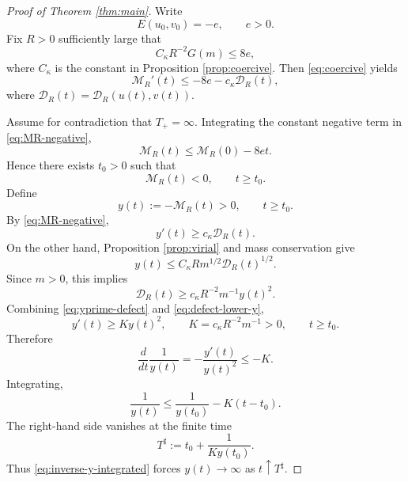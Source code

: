 \documentclass[10pt,a4paper]{amsart}
\numberwithin{equation}{section}
\begin{document}
\begin{proof}[Proof of Theorem \ref{thm:main}]
Write
\begin{equation*}
 E(u_0,v_0)=-e, \qquad e>0.
\end{equation*}
Fix $R>0$ sufficiently large that
\begin{equation*}
 C_\kappa R^{-2}G(m)\le8e,
\end{equation*}
where $C_\kappa$ is the constant in Proposition \ref{prop:coercive}.  Then \eqref{eq:coercive} yields
\begin{equation}\label{eq:MR-negative}
 \mathcal M_R'(t)\le-8e-c_\kappa\mathcal D_R(t),
\end{equation}
where $\mathcal D_R(t)=\mathcal D_R(u(t),v(t))$.

Assume for contradiction that $T_+=\infty$.  Integrating the constant negative term in \eqref{eq:MR-negative},
\begin{equation*}
 \mathcal M_R(t)\le\mathcal M_R(0)-8et.
\end{equation*}
Hence there exists $t_0>0$ such that
\[
 \mathcal M_R(t)<0, \qquad t\ge t_0.
\]
Define
\begin{equation*}
 y(t):=-\mathcal M_R(t)>0,
 \qquad t\ge t_0.
\end{equation*}
By \eqref{eq:MR-negative},
\begin{equation}\label{eq:yprime-defect}
 y'(t)\ge c_\kappa\mathcal D_R(t).
\end{equation}
On the other hand, Proposition \ref{prop:virial} and mass conservation give
\[
 y(t)\le C_\kappa Rm^{1/2}\mathcal D_R(t)^{1/2}.
\]
Since $m>0$, this implies
\begin{equation}\label{eq:defect-lower-y}
 \mathcal D_R(t)\ge c_\kappa R^{-2}m^{-1}y(t)^2.
\end{equation}
Combining \eqref{eq:yprime-defect} and \eqref{eq:defect-lower-y},
\begin{equation*}
 y'(t)\ge K y(t)^2, \qquad K=c_\kappa R^{-2}m^{-1}>0,
 \qquad t\ge t_0.
\end{equation*}
Therefore
\begin{equation*}
 \frac{d}{dt}\frac1{y(t)}=-\frac{y'(t)}{y(t)^2}\le-K.
\end{equation*}
Integrating,
\begin{equation}\label{eq:inverse-y-integrated}
 \frac1{y(t)}\le\frac1{y(t_0)}-K(t-t_0).
\end{equation}
The right-hand side vanishes at the finite time
\begin{equation*}
 T^\sharp:=t_0+\frac1{K y(t_0)}.
\end{equation*}
Thus \eqref{eq:inverse-y-integrated} forces $y(t)\to\infty$ as $t\uparrow T^\sharp$.


\end{proof}
\end{document}
